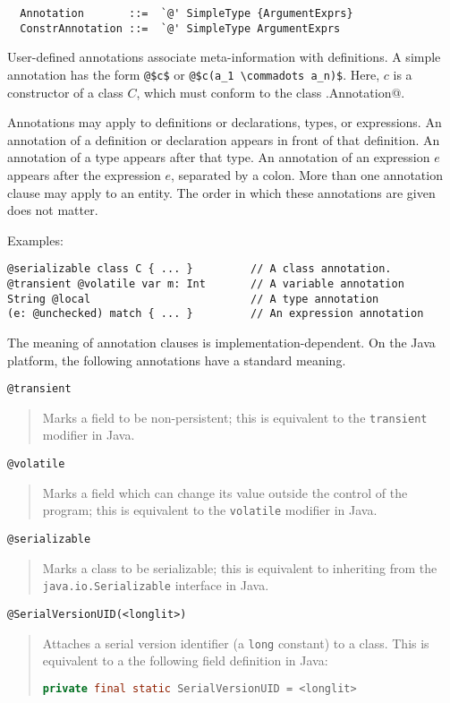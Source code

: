 \syntax\begin{lstlisting}
  Annotation       ::=  `@' SimpleType {ArgumentExprs}
  ConstrAnnotation ::=  `@' SimpleType ArgumentExprs
\end{lstlisting}

User-defined annotations associate meta-information with definitions.
A simple annotation has the form \lstinline^@$c$^ or
\lstinline^@$c(a_1 \commadots a_n)$^.  
Here, $c$ is a constructor of a class $C$, which must conform
to the class \lstinline@scala.Annotation@. 

Annotations may apply to definitions or declarations, types, or
expressions.  An annotation of a definition or declaration appears in
front of that definition.  An annotation of a type appears after
that type. An annotation of an expression $e$ appears after the
expression $e$, separated by a colon. More than one annotation clause
may apply to an entity. The order in which these annotations are given
does not matter.

Examples:
\begin{lstlisting}
@serializable class C { ... }         // A class annotation.
@transient @volatile var m: Int       // A variable annotation
String @local                         // A type annotation
(e: @unchecked) match { ... }         // An expression annotation
\end{lstlisting}

The meaning of annotation clauses is implementation-dependent. On the
Java platform, the following annotations have a standard meaning.\bigskip

\lstinline^@transient^
\begin{quote}
Marks a field to be non-persistent; this is
equivalent to the \lstinline^transient^
modifier in Java.
\end{quote}

\lstinline^@volatile^
\begin{quote}Marks a field which can change its value
outside the control of the program; this
is equivalent to the \lstinline^volatile^
modifier in Java.
\end{quote}

\lstinline^@serializable^
\begin{quote}Marks a class to be serializable; this is
equivalent to inheriting from the 
\lstinline^java.io.Serializable^ interface
in Java.
\end{quote}

\lstinline^@SerialVersionUID(<longlit>)^
\begin{quote}Attaches a serial version identifier (a
\lstinline^long^ constant) to a class.
This is equivalent to a the following field
definition in Java:
\begin{lstlisting}[language=Java]
  private final static SerialVersionUID = <longlit> 
\end{lstlisting}
\end{quote}

